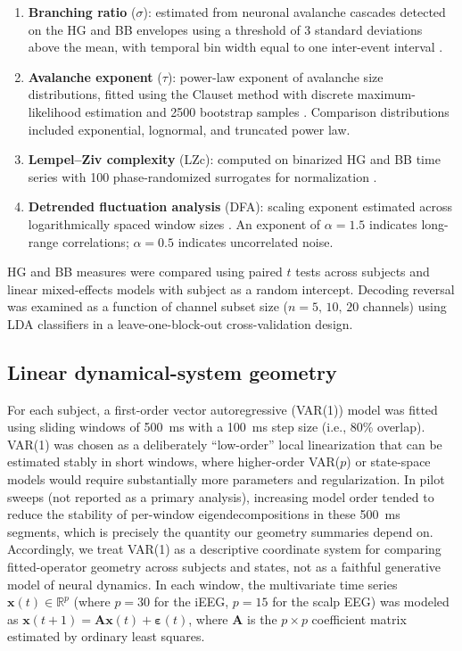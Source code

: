 \documentclass[preprint,12pt,nonatbib]{elsarticle}
\begin{document}
\begin{enumerate}[leftmargin=1.5em]
    \item \textbf{Branching ratio} ($\sigma$): estimated from neuronal avalanche cascades detected on the HG and BB envelopes using a threshold of 3 standard deviations above the mean, with temporal bin width equal to one inter-event interval \citep{Lombardi2023,Srinivasan2024}.
    \item \textbf{Avalanche exponent} ($\tau$): power-law exponent of avalanche size distributions, fitted using the Clauset method with discrete maximum-likelihood estimation and 2500 bootstrap samples \citep{Hengen2025}. Comparison distributions included exponential, lognormal, and truncated power law.
    \item \textbf{Lempel--Ziv complexity} (LZc): computed on binarized HG and BB time series with 100 phase-randomized surrogates for normalization \citep{Li2024,Liang2023,Newman2025}.
    \item \textbf{Detrended fluctuation analysis} (DFA): scaling exponent estimated across logarithmically spaced window sizes \citep{Grubov2025,Angiolelli2025,Mesquita2021}. An exponent of $\alpha=1.5$ indicates long-range correlations; $\alpha=0.5$ indicates uncorrelated noise.
\end{enumerate}

HG and BB measures were compared using paired $t$ tests across subjects and linear mixed-effects models with subject as a random intercept. Decoding reversal was examined as a function of channel subset size ($n=5,\,10,\,20$ channels) using LDA classifiers in a leave-one-block-out cross-validation design.

\subsection{Linear dynamical-system geometry}

For each subject, a first-order vector autoregressive (VAR(1)) model was fitted using sliding windows of 500~ms with a 100~ms step size (i.e., 80\% overlap). VAR(1) was chosen as a deliberately ``low-order'' local linearization that can be estimated stably in short windows, where higher-order VAR($p$) or state-space models would require substantially more parameters and regularization. In pilot sweeps (not reported as a primary analysis), increasing model order tended to reduce the stability of per-window eigendecompositions in these 500~ms segments, which is precisely the quantity our geometry summaries depend on. Accordingly, we treat VAR(1) as a descriptive coordinate system for comparing fitted-operator geometry across subjects and states, not as a faithful generative model of neural dynamics. In each window, the multivariate time series $\mathbf{x}(t) \in \mathbb{R}^{p}$ (where $p=30$ for the iEEG, $p=15$ for the scalp EEG) was modeled as $\mathbf{x}(t+1) = \mathbf{A}\mathbf{x}(t) + \boldsymbol{\varepsilon}(t)$, where $\mathbf{A}$ is the $p\times p$ coefficient matrix estimated by ordinary least squares.
\end{document}
